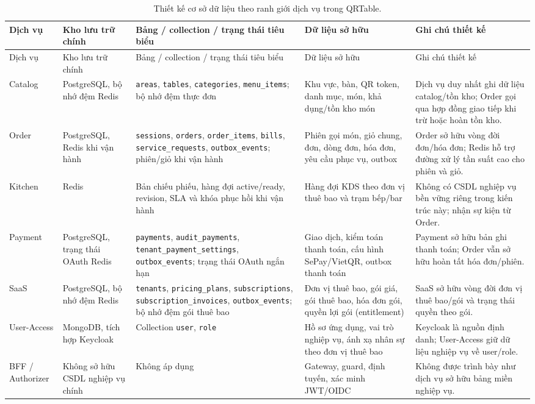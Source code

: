 {\scriptsize\sloppy
\setlength{\tabcolsep}{2pt}
\begin{longtable}{>{\raggedright\arraybackslash}p{}>{\raggedright\arraybackslash}p{}>{\raggedright\arraybackslash}p{}>{\raggedright\arraybackslash}p{}>{\raggedright\arraybackslash}p{}}
  \caption{Thiết kế cơ sở dữ liệu theo ranh giới dịch vụ trong QRTable.}
  \label{tab:chapter4-data-ownership-schema}\\
  \toprule
  Dịch vụ & Kho lưu trữ chính & Bảng / collection / trạng thái tiêu biểu & Dữ liệu sở hữu & Ghi chú thiết kế \\
  \midrule
  \endfirsthead
  \toprule
  Dịch vụ & Kho lưu trữ chính & Bảng / collection / trạng thái tiêu biểu & Dữ liệu sở hữu & Ghi chú thiết kế \\
  \midrule
  \endhead
  \bottomrule
  \endfoot
  Catalog & PostgreSQL, bộ nhớ đệm Redis & \texttt{areas}, \texttt{tables}, \texttt{categories}, \texttt{menu\_items}; bộ nhớ đệm thực đơn & Khu vực, bàn, QR token, danh mục, món, khả dụng/tồn kho món & Dịch vụ duy nhất ghi dữ liệu catalog/tồn kho; Order gọi qua hợp đồng giao tiếp khi trừ hoặc hoàn tồn kho. \\
  Order & PostgreSQL, Redis khi vận hành & \texttt{sessions}, \texttt{orders}, \texttt{order\_items}, \texttt{bills}, \texttt{service\_requests}, \texttt{outbox\_events}; phiên/giỏ khi vận hành & Phiên gọi món, giỏ chung, đơn, dòng đơn, hóa đơn, yêu cầu phục vụ, outbox & Order sở hữu vòng đời đơn/hóa đơn; Redis hỗ trợ đường xử lý tần suất cao cho phiên và giỏ. \\
  Kitchen & Redis & Bản chiếu phiếu, hàng đợi active/ready, revision, SLA và khóa phục hồi khi vận hành & Hàng đợi KDS theo đơn vị thuê bao và trạm bếp/bar & Không có CSDL nghiệp vụ bền vững riêng trong kiến trúc này; nhận sự kiện từ Order. \\
  Payment & PostgreSQL, trạng thái OAuth Redis & \texttt{payments}, \texttt{audit\_payments}, \texttt{tenant\_payment\_settings}, \texttt{outbox\_events}; trạng thái OAuth ngắn hạn & Giao dịch, kiểm toán thanh toán, cấu hình SePay/VietQR, outbox thanh toán & Payment sở hữu bản ghi thanh toán; Order vẫn sở hữu hoàn tất hóa đơn/phiên. \\
  SaaS & PostgreSQL, bộ nhớ đệm Redis & \texttt{tenants}, \texttt{pricing\_plans}, \texttt{subscriptions}, \texttt{subscription\_invoices}, \texttt{outbox\_events}; bộ nhớ đệm gói thuê bao & Đơn vị thuê bao, gói giá, gói thuê bao, hóa đơn gói, quyền lợi gói (entitlement) & SaaS sở hữu vòng đời đơn vị thuê bao/gói và trạng thái quyền theo gói. \\
  User-Access & MongoDB, tích hợp Keycloak & Collection \texttt{user}, \texttt{role} & Hồ sơ ứng dụng, vai trò nghiệp vụ, ánh xạ nhân sự theo đơn vị thuê bao & Keycloak là nguồn định danh; User-Access giữ dữ liệu nghiệp vụ về user/role. \\
  BFF / Authorizer & Không sở hữu CSDL nghiệp vụ chính & Không áp dụng & Gateway, guard, định tuyến, xác minh JWT/OIDC & Không được trình bày như dịch vụ sở hữu bảng miền nghiệp vụ. \\
\end{longtable}
}


